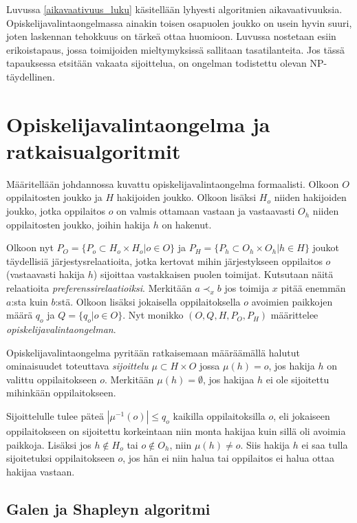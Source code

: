 \documentclass[twoside]{tktltiki}
\begin{document}
Luvussa \ref{aikavaativuus_luku} käsitellään lyhyesti algoritmien
aikavaativuuksia. Opiskelijavalintaongelmassa ainakin toisen osapuolen
joukko on usein hyvin suuri, joten laskennan tehokkuus on tärkeä ottaa
huomioon. Luvussa nostetaan esiin erikoistapaus, jossa toimijoiden
mieltymyksissä sallitaan tasatilanteita. Jos tässä tapauksessa
etsitään vakaata sijoittelua, on ongelman todistettu olevan
NP-täydellinen.

\section{Opiskelijavalintaongelma ja ratkaisualgoritmit}
\label{algoritmit_luku}

Määritellään johdannossa kuvattu opiskelijavalintaongelma formaalisti.
Olkoon $O$ oppilaitosten joukko ja $H$ hakijoiden joukko. Olkoon
lisäksi $H_o$ niiden hakijoiden joukko, jotka oppilaitos $o$ on valmis
ottamaan vastaan ja vastaavasti $O_h$ niiden oppilaitosten joukko,
joihin hakija $h$ on hakenut.

Olkoon nyt $P_O = \{P_o \subset H_o \times H_o | o \in O\}$ ja $P_H =
\{P_h \subset O_h \times O_h | h \in H\}$ joukot täydellisiä
järjestysrelaatioita, jotka kertovat mihin järjestykseen oppilaitos
$o$ (vastaavasti hakija $h$) sijoittaa vastakkaisen puolen toimijat.
Kutsutaan näitä relaatioita \emph{preferenssirelaatioiksi}. Merkitään
$a \prec_x b$ jos toimija $x$ pitää enemmän $a$:sta kuin $b$:stä.
Olkoon lisäksi jokaisella oppilaitoksella $o$ avoimien paikkojen määrä
$q_o$ ja $Q = \{q_o | o \in O\}$. Nyt monikko $(O, Q, H, P_O, P_H)$
määrittelee \emph{opiskelijavalintaongelman}.

Opiskelijavalintaongelma pyritään ratkaisemaan määräämällä halutut
ominaisuudet toteuttava \emph{sijoittelu} $\mu \subset H \times O$
jossa $\mu(h) = o$, jos hakija $h$ on valittu oppilaitokseen $o$.
Merkitään $\mu(h) = \emptyset$, jos hakijaa $h$ ei ole sijoitettu
mihinkään oppilaitokseen.

Sijoittelulle tulee päteä $|\mu^{-1}(o)| \leq q_o$ kaikilla
oppilaitoksilla $o$, eli jokaiseen oppilaitokseen on sijoitettu
korkeintaan niin monta hakijaa kuin sillä oli avoimia paikkoja.
Lisäksi jos $h \notin H_o$ tai $o \notin O_h$, niin $\mu(h) \neq o$.
Siis hakija $h$ ei saa tulla sijoitetuksi oppilaitokseen $o$, jos hän
ei niin halua tai oppilaitos ei halua ottaa hakijaa vastaan.

\subsection{Galen ja Shapleyn algoritmi}
\end{document}
